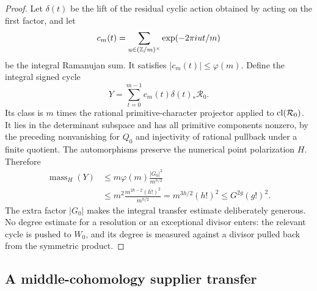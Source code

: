 \documentclass[11pt,a4paper]{article}
\theoremstyle{definition}\newtheorem{definition}[theorem]{Definition}
\theoremstyle{remark}\newtheorem{remark}[theorem]{Remark}
\begin{document}
\begin{proof}
Let $\delta(t)$ be the lift of the residual cyclic action obtained by acting on the first factor, and let
\[
 c_m(t)=\sum_{u\in(\mathbb Z/m)^\times}\exp(-2\pi iut/m)
\]
be the integral Ramanujan sum. It satisfies $|c_m(t)|\le\varphi(m)$. Define the integral signed cycle
\[
 Y=\sum_{t=0}^{m-1}c_m(t)\delta(t)_*\mathcal R_0.
\]
Its class is $m$ times the rational primitive-character projector applied to $\operatorname{cl}(\mathcal R_0)$. It lies in the determinant subspace and has all primitive components nonzero, by the preceding nonvanishing for $Q_0$ and injectivity of rational pullback under a finite quotient. The automorphisms preserve the numerical point polarization $H$. Therefore
\begin{align*}
 \operatorname{mass}_H(Y)
 &\le m\varphi(m)\frac{|G_0|^2}{m^{h/2}}\\
 &\le m^2\frac{m^{2h-2}(h!)^2}{m^{h/2}}
   =m^{3h/2}(h!)^2
   \le G^{2g}(g!)^2.
\end{align*}
The extra factor $|G_0|$ makes the integral transfer estimate deliberately generous. No degree estimate for a resolution or an exceptional divisor enters: the relevant cycle is pushed to $W_0$, and its degree is measured against a divisor pulled back from the symmetric product.
\end{proof}

\subsection{A middle-cohomology supplier transfer}
\end{document}
